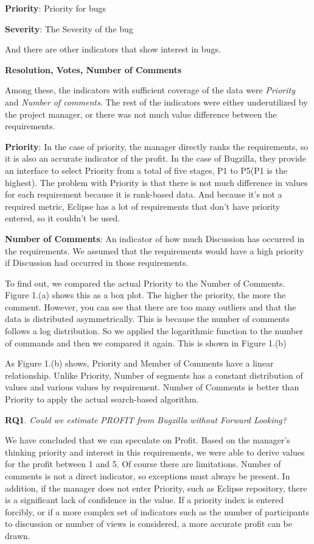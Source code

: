 \textbf{Priority}: Priority for bugs

\textbf{Severity}: The Severity of the bug

And there are other indicators that show interest in bugs.


\textbf{Resolution, Votes, Number of Comments}


Among these, the indicators with sufficient coverage of the data were \textit{Priority} and \textit{Number of comments}. The rest of the indicators were either underutilized by the project manager, or there was not much value difference between the requirements. 

\textbf{Priority}: In the case of priority, the manager directly ranks the requirements, so it is also an accurate indicator of the profit. In the case of Bugzilla, they provide an interface to select Priority from a total of five stages, P1 to P5(P1 is the highest). The problem with Priority is that there is not much difference in values for each requirement because it is rank-based data. And because it's not a required metric, Eclipse has a lot of requirements that don't have priority entered, so it couldn't be used.


\textbf{Number of Comments}: An indicator of how much Discussion has occurred in the requirements. We assumed that the requirements would have a high priority if Discussion had occurred in those requirements.

 To find out, we compared the actual Priority to the Number of Comments. Figure 1.(a) shows this as a box plot. The higher the priority, the more the comment. However, you can see that there are too many outliers and that the data is distributed asymmetrically. This is because the number of comments follows a log distribution. So we applied the logarithmic function to the number of commands and then we compared it again. This is shown in Figure 1.(b) 

As Figure 1.(b) shows, Priority and Member of Comments have a linear relationship. Unlike Priority, Number of segments has a constant distribution of values and various values by requirement. Number of Comments is better than Priority to apply the actual search-based algorithm. 

\textbf{RQ1}.\textit{ Could we estimate PROFIT from Bugzilla without Forward Looking?}

We have concluded that we can speculate on Profit. Based on the manager's thinking priority and interest in this requirements, we were able to derive values for the profit between 1 and 5. Of course there are limitations. Number of comments is not a direct indicator, so exceptions must always be present. In addition, if the manager does not enter Priority, such as Eclipse repository, there is a significant lack of confidence in the value. If a priority index is entered forcibly, or if a more complex set of indicators such as the number of participants to discussion or number of views is considered, a more accurate profit can be drawn.


